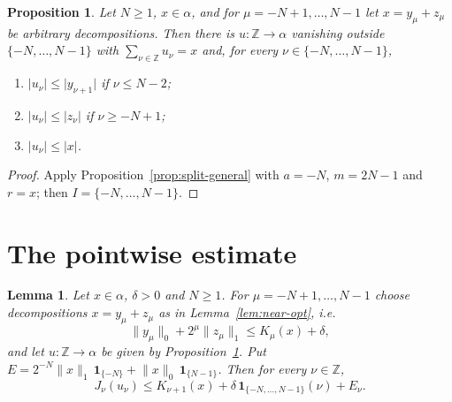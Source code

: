 \documentclass[11pt]{article}
\newtheorem{proposition}[theorem]{Proposition}
\newtheorem{lemma}[theorem]{Lemma}
\theoremstyle{definition}
\theoremstyle{remark}
\newcommand{\abs}[1]{\lvert #1\rvert}
\newcommand{\norm}[2]{\lVert #1\rVert_{#2}}
\newcommand{\Z}{\mathbb Z}
\newcommand{\one}{\mathbf 1}
\begin{document}
\begin{proposition}\label{prop:split}
  Let \(N \ge 1\), \(x \in \alpha\), and for \(\mu = -N+1, \dots, N-1\) let
  \(x = y_\mu + z_\mu\) be arbitrary decompositions. Then there is
  \(u \colon \Z \to \alpha\) vanishing outside \(\{-N, \dots, N-1\}\) with \(\sum_{\nu \in \Z} u_\nu = x\) and,
  for every \(\nu \in \{-N, \dots, N-1\}\),
  \begin{enumerate}
    \item[(a)] \(\abs{u_\nu} \le \abs{y_{\nu+1}}\) if \(\nu \le N-2\);
    \item[(b)] \(\abs{u_\nu} \le \abs{z_\nu}\) if \(\nu \ge -N+1\);
    \item[(c)] \(\abs{u_\nu} \le \abs{x}\).
  \end{enumerate}
\end{proposition}

\begin{proof}
  Apply Proposition~\ref{prop:split-general} with \(a = -N\), \(m = 2N-1\) and \(r = x\);
  then \(I = \{-N, \dots, N-1\}\).
\end{proof}

\section{The pointwise estimate}

\begin{lemma}\label{lem:pointwise}
  Let \(x \in \alpha\), \(\delta > 0\) and \(N \ge 1\). For \(\mu = -N+1, \dots, N-1\) choose
  decompositions \(x = y_\mu + z_\mu\) as in Lemma~\ref{lem:near-opt}, i.e.
  \begin{equation}\label{eq:near-opt}
    \norm{y_\mu}{0} + 2^\mu \norm{z_\mu}{1} \le K_\mu(x) + \delta,
  \end{equation}
  and let \(u \colon \Z \to \alpha\) be given by Proposition~\ref{prop:split}. Put
  \(E = 2^{-N}\norm{x}{1}\,\one_{\{-N\}} + \norm{x}{0}\,\one_{\{N-1\}}\). Then for every
  \(\nu \in \Z\),
  \[
    J_\nu(u_\nu) \le K_{\nu+1}(x) + \delta\,\one_{\{-N, \dots, N-1\}}(\nu) + E_\nu .
  \]
\end{lemma}
\end{document}
